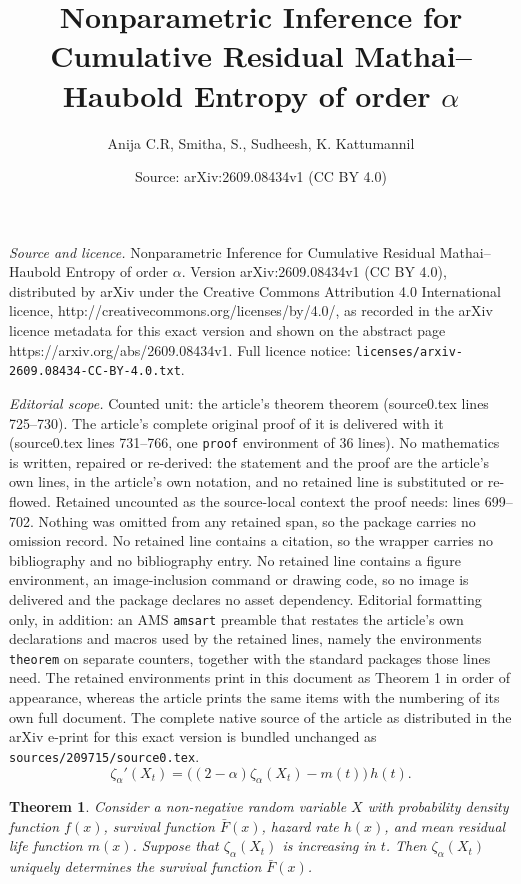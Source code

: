 \documentclass[10pt,a4paper]{amsart}
\title{Nonparametric Inference for Cumulative Residual Mathai--Haubold Entropy of order $\alpha$}
\author{Anija C.R, Smitha, S., Sudheesh, K. Kattumannil}
\date{Source: arXiv:2609.08434v1 (CC BY 4.0)}
\newtheorem{theorem}{Theorem}
\begin{document}
\maketitle

\noindent\emph{Source and licence.} Nonparametric Inference for Cumulative Residual Mathai--Haubold Entropy of order $\alpha$. Version arXiv:2609.08434v1 (CC BY 4.0), distributed by arXiv under the Creative Commons Attribution 4.0 International licence, http://creativecommons.org/licenses/by/4.0/, as recorded in the arXiv licence metadata for this exact version and shown on the abstract page https://arxiv.org/abs/2609.08434v1. Full licence notice: \texttt{licenses/arxiv-2609.08434-CC-BY-4.0.txt}.\par\smallskip

\noindent\textit{Editorial scope.} Counted unit: the article's theorem theorem (source0.tex lines 725--730). The article's complete original proof of it is delivered with it (source0.tex lines 731--766, one \texttt{proof} environment of 36 lines). No mathematics is written, repaired or re-derived: the statement and the proof are the article's own lines, in the article's own notation, and no retained line is substituted or re-flowed.  Retained uncounted as the source-local context the proof needs: lines 699--702.  Nothing was omitted from any retained span, so the package carries no omission record.  No retained line contains a citation, so the wrapper carries no bibliography and no bibliography entry.  No retained line contains a figure environment, an image-inclusion command or drawing code, so no image is delivered and the package declares no asset dependency.  Editorial formatting only, in addition: an AMS \texttt{amsart} preamble that restates the article's own declarations and macros used by the retained lines, namely the environments \texttt{theorem} on separate counters, together with the standard packages those lines need.  The retained environments print in this document as Theorem 1 in order of appearance, whereas the article prints the same items with the numbering of its own full document.  The complete native source of the article as distributed in the arXiv e-print for this exact version is bundled unchanged as \texttt{sources/209715/source0.tex}.
\begin{equation}\label{relationship}
\zeta_{\alpha}'(X_t)
=\bigl((2-\alpha)\zeta_{\alpha}(X_t)-m(t)\bigr)\,h(t).
\end{equation}

\begin{theorem}
 Consider a non-negative random variable $X$ with probability density function $f(x)$,
survival function $\bar{F}(x)$, hazard rate $h(x)$, and mean residual life function
$m(x)$. Suppose that $\zeta_{\alpha}(X_t)$ is increasing in $t$. Then
$\zeta_{\alpha}(X_t)$ uniquely determines the survival function $\bar{F}(x)$.
\end{theorem}
\end{document}
